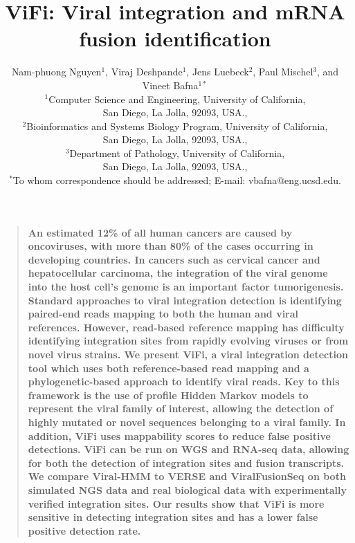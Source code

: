\documentclass[10pt]{article}
\title{ViFi: Viral integration and mRNA fusion identification}
\author
{Nam-phuong Nguyen$^{1}$, Viraj Deshpande$^{1}$, 
Jens Luebeck$^{2}$, Paul Mischel$^{3}$, and Vineet Bafna$^{1\ast}$\\
\normalsize{$^{1}$Computer Science and Engineering, University of California,}\\
\normalsize{San Diego, La Jolla, 92093, USA.,}\\
\normalsize{$^{2}$Bioinformatics and Systems Biology Program, University of California,}\\
\normalsize{San Diego, La Jolla, 92093, USA.,}\\
\normalsize{$^{3}$Department of Pathology, University of California,}\\
\normalsize{San Diego, La Jolla, 92093, USA.,}\\
\normalsize{$^\ast$To whom correspondence should be addressed; E-mail:  vbafna@eng.ucsd.edu.}
}
\date{}
\newenvironment{sciabstract}{%
\begin{quote} \bf}
{\end{quote}}
\begin{document}
 


\baselineskip24pt


\maketitle 


\begin{sciabstract}
An estimated 12\% of all human cancers are caused by oncoviruses, with more than 80\% of the cases occurring in developing countries.  In cancers such as cervical cancer and hepatocellular carcinoma, the integration of the viral genome into the host cell's genome is an important factor tumorigenesis.  Standard approaches to viral integration detection is identifying paired-end reads mapping to both the human and viral references.  However, read-based reference mapping has difficulty identifying integration sites from rapidly evolving viruses or from novel virus strains.  We present ViFi, a viral integration detection tool which uses both reference-based read mapping and a phylogenetic-based approach to identify viral reads.  Key to this framework is the use of profile Hidden Markov models to represent the viral family of interest, allowing the detection of highly mutated or novel  sequences belonging to a viral family.  In addition, ViFi uses mappability scores to reduce false positive detections.  ViFi can be run on WGS and RNA-seq data, allowing for both the detection of integration sites and fusion transcripts.  We compare Viral-HMM to VERSE and ViralFusionSeq on both simulated NGS data and real biological data with experimentally verified integration sites.  Our results show that ViFi is more sensitive in detecting integration sites and has a lower false positive detection rate.
\end{sciabstract}
\end{document}
